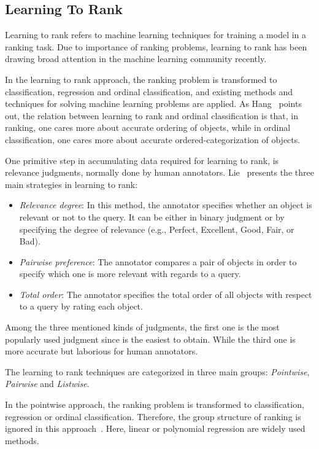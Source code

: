 \subsection{Learning To Rank}
Learning to rank refers to machine learning techniques for training a model in a ranking task. Due to importance of ranking problems, learning to rank has been drawing broad attention in the machine learning community recently. 

In the learning to rank approach, the ranking problem is transformed to classification, regression and ordinal classification, and existing methods and techniques for solving machine learning problems are applied. As Hang~\cite{l2r-intro} points out, the relation between learning to rank and ordinal classification is that, in ranking, one cares more about accurate ordering of objects, while in ordinal classification, one cares more about accurate ordered-categorization of objects.

One primitive step in accumulating data required for learning to rank, is relevance judgments, normally done by human annotators. Lie~\cite{l2r-book} presents the three main strategies in learning to rank:
\begin{itemize}
\item \textit{Relevance degree}: In this method, the annotator specifies whether an object is relevant or not to the query. It can be either in binary judgment or by specifying the degree of relevance (e.g., Perfect, Excellent, Good, Fair, or Bad).
\item \textit{Pairwise preference}: The annotator compares a pair of objects in order to specify which one is more relevant with regards to a query.
\item \textit{Total order}: The annotator specifies the total order of all objects with respect to a query by rating each object.
\end{itemize}

Among the three mentioned kinds of judgments, the first one is the most popularly used judgment since is the easiest to obtain. While the third one is more accurate but laborious for human annotators.

The learning to rank techniques are categorized in three main groups: \textit{Pointwise}, \textit{Pairwise} and \textit{Listwise}.

In the pointwise approach, the ranking problem is transformed to classification, regression or ordinal classification. Therefore, the group structure of ranking is ignored in this approach~\cite{l2r-intro}. Here, linear or polynomial regression are widely used methods.


